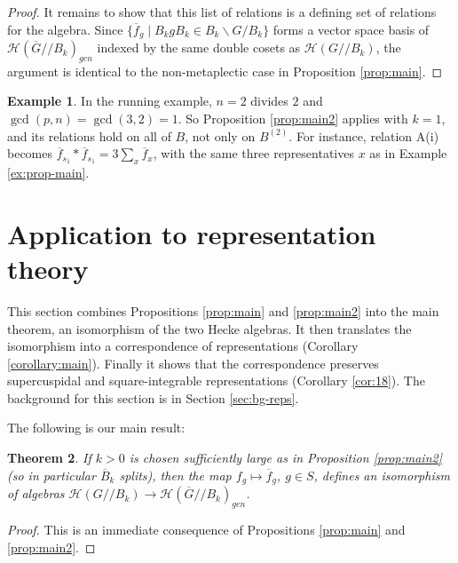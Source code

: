 \documentclass[12pt,letterpaper,reqno]{amsart}
\let\cal\mathcal
\newtheorem{theorem}{Theorem}[section]
\theoremstyle{definition}
\newtheorem{example}[theorem]{Example}
\theoremstyle{remark}
\numberwithin{equation}{section}
\begin{document}
\begin{proof}
It remains to show that this list of relations is a defining set of relations
for the algebra. Since $\{\overline{f}_g \mid B_kgB_k\in B_k\backslash G/B_k\}$
forms a vector space basis of ${\cal H}(\overline{G}//B_k)_{gen}$ indexed by
the same double cosets as ${\cal H}(G//B_k)$, the argument is identical to the
non-metaplectic case in Proposition \ref{prop:main}.
\end{proof}

\begin{example}
\label{ex:prop-main2}
In the running example, $n=2$ divides $2$ and $\gcd(p,n)=\gcd(3,2)=1$. So
Proposition \ref{prop:main2} applies with $k=1$, and its relations hold on all
of $B$, not only on $B^{(2)}$. For instance, relation A(i) becomes
$\overline{f}_{s_1}*\overline{f}_{s_1}=3\sum_x\overline{f}_x$, with the same
three representatives $x$ as in Example \ref{ex:prop-main}.
\end{example}

\section{Application to representation theory}
\label{sec:application}

This section combines Propositions \ref{prop:main} and \ref{prop:main2} into
the main theorem, an isomorphism of the two Hecke algebras. It then translates
the isomorphism into a correspondence of representations (Corollary
\ref{corollary:main}). Finally it shows that the correspondence preserves
supercuspidal and square-integrable representations (Corollary \ref{cor:18}).
The background for this section is in Section \ref{sec:bg-reps}.

The following is our main result:

\begin{theorem}
\label{thrm:main}
If $k>0$ is chosen sufficiently large as in Proposition \ref{prop:main2} (so
in particular $\overline{B}_k$ splits), then the map
$f_{g}\longmapsto \overline{f}_{g}$, $g\in S$, defines an isomorphism of
algebras ${\cal H}(G//B_k)\rightarrow {\cal H}(\overline{G}//B_k)_{gen}$.
\end{theorem}

\begin{proof}
This is an immediate consequence of Propositions \ref{prop:main} and
\ref{prop:main2}.
\end{proof}
\end{document}
